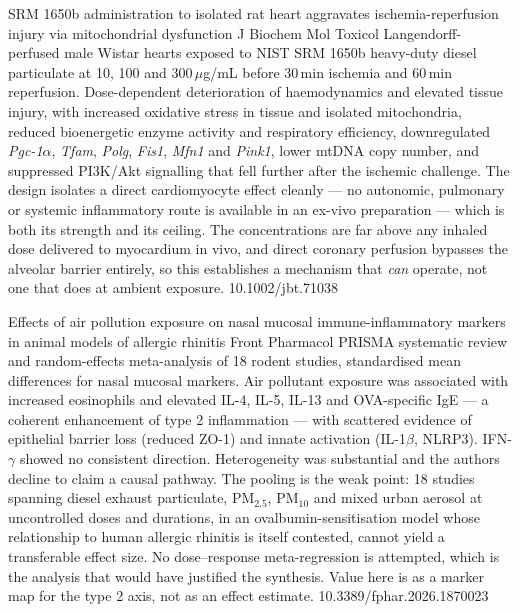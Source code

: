 \documentclass[10pt]{article}
\begin{document}
{SRM 1650b administration to isolated rat heart aggravates ischemia-reperfusion injury
via mitochondrial dysfunction}
{J Biochem Mol Toxicol}
{Langendorff-perfused male Wistar hearts exposed to NIST SRM 1650b heavy-duty diesel
particulate at 10, 100 and 300\,$\mu$g/mL before 30\,min ischemia and 60\,min
reperfusion. Dose-dependent deterioration of haemodynamics and elevated tissue injury,
with increased oxidative stress in tissue and isolated mitochondria, reduced bioenergetic
enzyme activity and respiratory efficiency, downregulated \textit{Pgc-1$\alpha$},
\textit{Tfam}, \textit{Polg}, \textit{Fis1}, \textit{Mfn1} and \textit{Pink1}, lower mtDNA
copy number, and suppressed PI3K/Akt signalling that fell further after the ischemic
challenge. The design isolates a direct cardiomyocyte effect cleanly --- no autonomic,
pulmonary or systemic inflammatory route is available in an ex-vivo preparation --- which
is both its strength and its ceiling. The concentrations are far above any inhaled dose
delivered to myocardium in vivo, and direct coronary perfusion bypasses the alveolar
barrier entirely, so this establishes a mechanism that \emph{can} operate, not one that
does at ambient exposure.}
{10.1002/jbt.71038}

{Effects of air pollution exposure on nasal mucosal immune-inflammatory markers in animal
models of allergic rhinitis}
{Front Pharmacol}
{PRISMA systematic review and random-effects meta-analysis of 18 rodent studies,
standardised mean differences for nasal mucosal markers. Air pollutant exposure was
associated with increased eosinophils and elevated IL-4, IL-5, IL-13 and OVA-specific IgE
--- a coherent enhancement of type 2 inflammation --- with scattered evidence of
epithelial barrier loss (reduced ZO-1) and innate activation (IL-1$\beta$, NLRP3).
IFN-$\gamma$ showed no consistent direction. Heterogeneity was substantial and the
authors decline to claim a causal pathway. The pooling is the weak point: 18 studies
spanning diesel exhaust particulate, PM$_{2.5}$, PM$_{10}$ and mixed urban aerosol at
uncontrolled doses and durations, in an ovalbumin-sensitisation model whose relationship
to human allergic rhinitis is itself contested, cannot yield a transferable effect size.
No dose--response meta-regression is attempted, which is the analysis that would have
justified the synthesis. Value here is as a marker map for the type 2 axis, not as an
effect estimate.}
{10.3389/fphar.2026.1870023}

\end{document}
